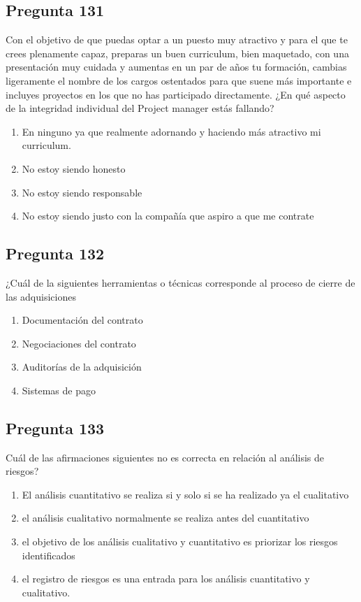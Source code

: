 \documentclass[11pt,a4paper]{article}
\begin{document}
\subsection*{Pregunta 131}
Con el objetivo de que puedas optar a un puesto muy atractivo y para el que te crees plenamente capaz, preparas un buen curriculum, bien maquetado, con una presentación muy cuidada y aumentas en un par de años tu formación, cambias ligeramente el nombre de los cargos ostentados para que suene más importante e incluyes proyectos en los que no has participado directamente. ¿En qué aspecto de la integridad individual del Project manager estás fallando?

\begin{enumerate}[label=\alph*)]
  \item En ninguno ya que realmente adornando y haciendo más atractivo mi curriculum.
  \item No estoy siendo honesto
  \item No estoy siendo responsable
  \item No estoy siendo justo con la compañía que aspiro a que me contrate
\end{enumerate}

\subsection*{Pregunta 132}
¿Cuál de la siguientes herramientas o técnicas corresponde al proceso de cierre de las adquisiciones

\begin{enumerate}[label=\alph*)]
  \item Documentación del contrato
  \item Negociaciones del contrato
  \item Auditorías de la adquisición
  \item Sistemas de pago
\end{enumerate}

\subsection*{Pregunta 133}
Cuál de las afirmaciones siguientes no es correcta en relación al análisis de riesgos?

\begin{enumerate}[label=\alph*)]
  \item El análisis cuantitativo se realiza si y solo si se ha realizado ya el cualitativo
  \item el análisis cualitativo normalmente se realiza antes del cuantitativo
  \item el objetivo de los análisis cualitativo y cuantitativo es priorizar los riesgos identificados
  \item el registro de riesgos es una entrada para los análisis cuantitativo y cualitativo.
\end{enumerate}
\end{document}
